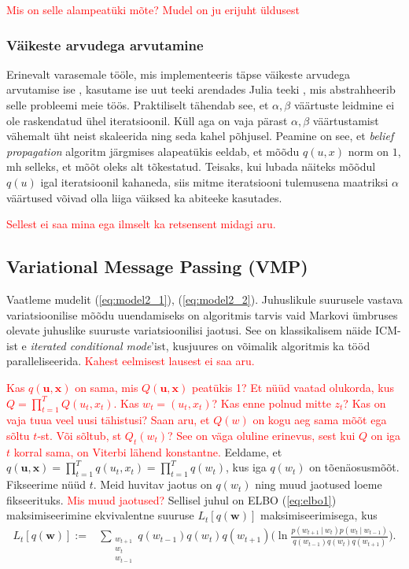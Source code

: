 \textcolor{red}{Mis on selle alampeatüki mõte? Mudel on ju erijuht üldusest}


\subsubsection{Väikeste arvudega arvutamine}\label{sec:computations_with_small_numbers}

Erinevalt varasemale tööle, mis implementeeris täpse väikeste arvudega arvutamise ise \parencite{Soop.2023}, kasutame ise uut teeki \parencite{Pihel.2024} arendades Julia teeki \parencite{Rowley.2024}, mis abstrahheerib selle probleemi meie töös. Praktiliselt tähendab see, et $\alpha, \beta$ väärtuste leidmine ei ole raskendatud ühel iteratsioonil. Küll aga on vaja pärast $\alpha, \beta$ väärtustamist vähemalt üht neist skaleerida ning seda kahel põhjusel. Peamine on see, et \emph{belief propagation} algoritm järgmises alapeatükis eeldab, et mõõdu $q(u,x)$ norm on $1$, mh selleks, et mõõt oleks alt tõkestatud. Teisaks, kui lubada näiteks mõõdul $q(u)$ igal iteratsioonil kahaneda, siis mitme iteratsiooni tulemusena maatriksi $\alpha$ väärtused võivad olla liiga väiksed ka abiteeke kasutades.

\textcolor{red}{Sellest ei saa mina ega ilmselt ka retsensent midagi aru.}
\subsection{Variational Message Passing (VMP)}\label{sec:VMP}

Vaatleme mudelit (\ref{eq:model2_1}), (\ref{eq:model2_2}). Juhuslikule suurusele vastava variatsioonilise mõõdu uuendamiseks on algoritmis tarvis vaid Markovi ümbruses olevate juhuslike suuruste variatsioonilisi jaotusi. See on klassikalisem näide ICM-ist e \emph{iterated conditional mode}'ist, kusjuures on võimalik algoritmis ka tööd paralleliseerida. \textcolor{red}{Kahest eelmisest lausest ei saa aru.}

\textcolor{red}{Kas  $q(\bm{u}, \bm{x})$  on sama, mis  $Q(\bm{u}, \bm{x})$ peatükis 1? Et nüüd vaatad olukorda, kus $Q= \prod_{t=1}^T{Q(u_t, x_t)}$. Kas $w_t=(u_t,x_t)$? Kas enne polnud mitte $z_t$? Kas on vaja tuua veel uusi tähistusi? Saan aru, et $Q(w)$ on kogu aeg sama mõõt ega sõltu $t$-st. Või sõltub, st $Q_t(w_t)$? See on väga oluline erinevus, sest kui $Q$ on iga $t$ korral sama, on Viterbi lähend konstantne.}
Eeldame, et $q(\bm{u}, \bm{x}) = \prod_{t=1}^T{q(u_t, x_t)} = \prod_{t=1}^T{q(w_t)}$, kus iga $q(w_t)$ on tõenäosusmõõt. Fikseerime nüüd $t$. Meid huvitav jaotus on $q(w_t)$ ning muud jaotused loeme fikseerituks. \textcolor{red}{Mis muud jaotused?} Sellisel juhul on ELBO (\ref{eq:elbo1}) maksimiseerimine ekvivalentne suuruse $L_t[q(\bm{w})]$ maksimiseerimisega, kus
\begin{align*}
    L_t[q(\bm{w})] :=& \sum_{\substack{w_{t+1}\\ w_{t} \\ w_{t-1}}} q(w_{t-1}) q(w_{t}) q(w_{t+1}) \Big(\ln \frac{p(w_{t+1} \ |\ w_{t} )p(w_{t}\ |\ w_{t-1})}{q(w_{t-1})q(w_{t})q(w_{t+1})}  \Big).
\end{align*}


